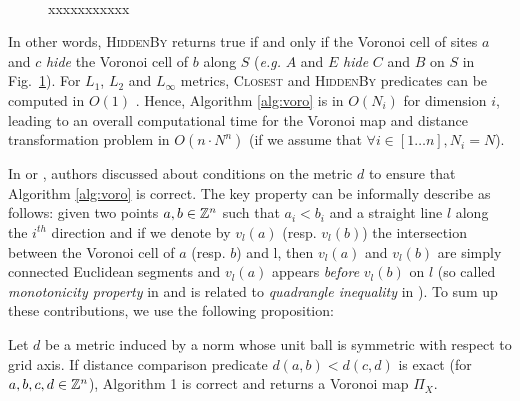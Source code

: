 \documentclass{llncs}
\begin{document}
\begin{figure}
  \begin{center}
    ~~~~~~~~~~
  \end{center}
  \caption{xxxxxxxxxxx}
  \label{fig:predicates}
\end{figure}

In other words, \textsc{HiddenBy} returns true if and only if the
Voronoi cell of sites $a$ and $c$ \emph{hide} the Voronoi cell of $b$
along $S$ (\emph{e.g.} $A$ and $E$ \emph{hide} $C$ and $B$ on $S$ in
Fig.~\ref{fig:predicates}).  For $L_1$, $L_2$ and $L_\infty$ metrics,
\textsc{Closest} and \textsc{HiddenBy} predicates can be computed in
$O(1)$ \cite{Breu1995,Hirata1996,Meijster2000}. Hence, Algorithm
\ref{alg:voro} is in $O(N_i)$ for dimension $i$, leading to an overall
computational time for the Voronoi map and distance transformation
problem in $O(n\cdot N^n)$ (if we assume that $\forall i\in[1\ldots
  n], N_i=N$).

In \cite{Hirata1996} or \cite{maurer_pami}, authors discussed about
conditions on the metric $d$ to ensure that Algorithm \ref{alg:voro}
is correct. The key property can be informally describe as follows:
given two points $a,b\in{\mathbb{Z}}^n$ such that $a_i<b_i$ and a straight line
$l$ along the $i^{th}$ direction and if we denote by $v_l(a)$
(resp. $v_l(b)$) the intersection between the Voronoi cell of $a$
(resp. $b$) and l, then $v_l(a)$ and $v_l(b)$ are simply connected
Euclidean segments and $v_l(a)$ appears \emph{before} $v_l(b)$ on $l$
(so called \emph{monotonicity property} in \cite{Maurer2003} and is
related to \emph{quadrangle inequality} in \cite{Hirata1996}).  To sum
up these contributions, we use the following proposition:
\begin{proposition}
\label{prop:voronoi-map-from-1}
  Let $d$ be a metric induced by a norm whose unit ball is symmetric
  with respect to grid axis. If distance comparison predicate
  $d(a,b)<d(c,d)$ is exact (for $a,b,c,d\in{\mathbb{Z}}^n$), Algorithm 1 is
  correct and returns a Voronoi map $\Pi_X$.
\end{proposition}
\end{document}

